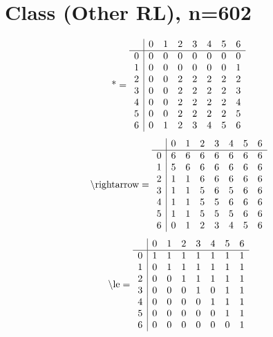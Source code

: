 \documentclass[11pt]{article}
\begin{document}
\section{Class (Other RL), n=602}
\[\text{*} = 
\begin{array}{r | r r r r r r r}
 & 0 & 1 & 2 & 3 & 4 & 5 & 6 \\ \hline
0 & 0 & 0 & 0 & 0 & 0 & 0 & 0 \\
1 & 0 & 0 & 0 & 0 & 0 & 0 & 1 \\
2 & 0 & 0 & 2 & 2 & 2 & 2 & 2 \\
3 & 0 & 0 & 2 & 2 & 2 & 2 & 3 \\
4 & 0 & 0 & 2 & 2 & 2 & 2 & 4 \\
5 & 0 & 0 & 2 & 2 & 2 & 2 & 5 \\
6 & 0 & 1 & 2 & 3 & 4 & 5 & 6 \\
\end{array}
\]
\[\text{\textbackslash rightarrow} = 
\begin{array}{r | r r r r r r r}
 & 0 & 1 & 2 & 3 & 4 & 5 & 6 \\ \hline
0 & 6 & 6 & 6 & 6 & 6 & 6 & 6 \\
1 & 5 & 6 & 6 & 6 & 6 & 6 & 6 \\
2 & 1 & 1 & 6 & 6 & 6 & 6 & 6 \\
3 & 1 & 1 & 5 & 6 & 5 & 6 & 6 \\
4 & 1 & 1 & 5 & 5 & 6 & 6 & 6 \\
5 & 1 & 1 & 5 & 5 & 5 & 6 & 6 \\
6 & 0 & 1 & 2 & 3 & 4 & 5 & 6 \\
\end{array}
\]
\[\text{\textbackslash le} = 
\begin{array}{r | r r r r r r r}
 & 0 & 1 & 2 & 3 & 4 & 5 & 6 \\ \hline
0 & 1 & 1 & 1 & 1 & 1 & 1 & 1 \\
1 & 0 & 1 & 1 & 1 & 1 & 1 & 1 \\
2 & 0 & 0 & 1 & 1 & 1 & 1 & 1 \\
3 & 0 & 0 & 0 & 1 & 0 & 1 & 1 \\
4 & 0 & 0 & 0 & 0 & 1 & 1 & 1 \\
5 & 0 & 0 & 0 & 0 & 0 & 1 & 1 \\
6 & 0 & 0 & 0 & 0 & 0 & 0 & 1 \\
\end{array}
\]
\end{document}
